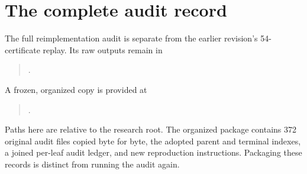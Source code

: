 \section{The complete audit record}\label{app:audit}
The full reimplementation audit is separate from the earlier revision's
54-certificate replay. Its raw outputs remain in
\begin{quote}\small\raggedright
{}.
\end{quote}
A frozen, organized copy is provided at
\begin{quote}\small\raggedright
{}.
\end{quote}
Paths here are relative to the research root. The organized package
contains 372 original audit files copied byte for byte, the adopted
parent and terminal indexes, a joined per-leaf audit ledger, and new
reproduction instructions. Packaging these records is distinct from
running the audit again.

